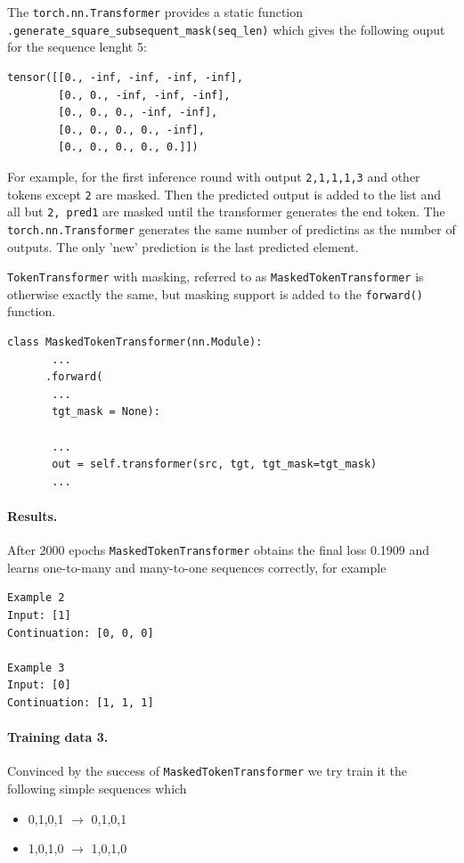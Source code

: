 \documentclass[final]{article}
\begin{document}
The \texttt{torch.nn.Transformer} provides a static function
\texttt{.generate\_square\_subsequent\_mask(seq\_len)} which gives the following ouput for the sequence lenght 5:
\begin{verbatim}
tensor([[0., -inf, -inf, -inf, -inf],
        [0., 0., -inf, -inf, -inf],
        [0., 0., 0., -inf, -inf],
        [0., 0., 0., 0., -inf],
        [0., 0., 0., 0., 0.]])
\end{verbatim}
For example, for the first inference round with output \texttt{2,1,1,1,3} and other tokens except \texttt{2} are masked. Then the predicted output is added to the list and all but \texttt{2, pred1} are masked until the transformer generates the end token. The \texttt{torch.nn.Transformer} generates the same number of predictins as the number of outputs. The only 'new' prediction is the last predicted element. 

\texttt{TokenTransformer} with masking, referred to as \texttt{MaskedTokenTransformer} is otherwise exactly the same, but masking support is added to the \texttt{forward()} function.
\begin{lstlisting}
class MaskedTokenTransformer(nn.Module):
       ...
      .forward(
       ...
       tgt_mask = None):

       ...
       out = self.transformer(src, tgt, tgt_mask=tgt_mask)
       ...
\end{lstlisting}


\paragraph{Results.}
After 2000 epochs \texttt{MaskedTokenTransformer} obtains the final loss 0.1909 and learns one-to-many and many-to-one sequences correctly, for example
\begin{verbatim}
Example 2
Input: [1]
Continuation: [0, 0, 0]

Example 3
Input: [0]
Continuation: [1, 1, 1]
\end{verbatim}


\paragraph{Training data 3.} Convinced by the success of \texttt{MaskedTokenTransformer} we try train it the following simple sequences which
\begin{itemize}
  \item 0,1,0,1 $\rightarrow$ 0,1,0,1
  \item 1,0,1,0 $\rightarrow$ 1,0,1,0
\end{itemize}
\end{document}
